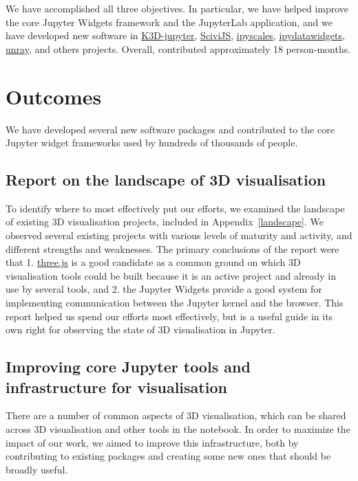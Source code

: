 \documentclass{deliverablereport}
\begin{document}
We have accomplished all three objectives. In particular, we have helped improve the
core Jupyter Widgets framework and the JupyterLab application, and we have
developed new software in
\href{https://github.com/K3D-tools/K3D-jupyter}{K3D-jupyter},
\href{https://demo.logilab.fr/SciviJS/}{SciviJS},
\href{https://github.com/vidartf/ipyscales}{ipyscales},
\href{https://github.com/vidartf/ipydatawidgets}{ipydatawidgets},
\href{https://github.com/vidartf/unray}{unray},
and others projects.
Overall, \ODK contributed approximately 18 person-months.



\section{Outcomes}

We have developed several new software packages and contributed to the core Jupyter widget frameworks used by hundreds of thousands of people.

\subsection{Report on the landscape of 3D visualisation}

To identify where to most effectively put our efforts,
we examined the landscape of existing 3D visualisation projects,
included in Appendix~\ref{landscape}.
We observed several existing projects with various levels of maturity and activity, and different strengths and weaknesses.
The primary conclusions of the report were that 1. \href{https://threejs.org}{three.js} is a good candidate as a common ground on which 3D visualisation tools could be built because it is an active project and already in use by several tools, and 2. the Jupyter Widgets provide a good system for implementing communication between the Jupyter kernel and the browser.
This report helped us spend our efforts most effectively,
but is a useful guide in its own right for observing the state
of 3D visualisation in Jupyter.


\subsection{Improving core Jupyter tools and infrastructure for visualisation}\label{improving-core}

There are a number of common aspects of 3D visualisation,
which can be shared across 3D visualisation and other tools
in the notebook.
In order to maximize the impact of our work,
we aimed to improve this infrastructure,
both by contributing to existing packages and creating some new ones
that should be broadly useful.
\end{document}
